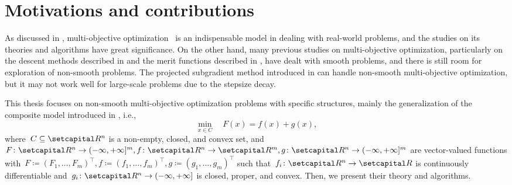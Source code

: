 \documentclass[../main]{subfiles}
\begin{document}
\section{Motivations and contributions} 
As discussed in , multi-objective optimization~ is an indispensable model in dealing with real-world problems, and the studies on its theories and algorithms have great significance.
On the other hand, many previous studies on multi-objective optimization, particularly on the descent methods described in  and the merit functions described in , have dealt with smooth problems, and there is still room for exploration of non-smooth problems.
The projected subgradient method introduced in  can handle non-smooth multi-objective optimization, but it may not work well for large-scale problems due to the stepsize decay.

This thesis focuses on non-smooth multi-objective optimization problems with specific structures, mainly the generalization of the composite model introduced in , i.e.,
\begin{equation} \label{eq:composite_MO}
    \min_{x \in C} \quad F(x) = f(x) + g(x)
,\end{equation} 
where~$C \subseteq \setR^n$ is a non-empty, closed, and convex set, and~$F \colon \setR^n \to (-\infty, +\infty]^m, f \colon \setR^n \to \setR^m, g \colon \setR^n \to (-\infty, +\infty]^m$ are vector-valued functions with~$F \coloneqq (F_1, \dots, F_m)^\top, f \coloneqq (f_1, \dots, f_m)^\top, g \coloneqq (g_1, \dots, g_m)^\top$ such that~$f_i \colon \setR^n \to \setR$ is continuously differentiable and~$g_i \colon \setR^n \to (-\infty, +\infty]$ is closed, proper, and convex.
Then, we present their theory and algorithms.
\end{document}
